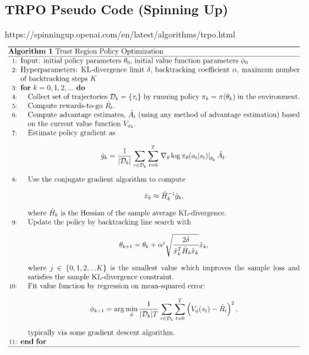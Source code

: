 \documentclass{article}
\theoremstyle{definition}
\theoremstyle{note}
\begin{document}
\subsection*{TRPO Pseudo Code (Spinning Up)}
https://spinningup.openai.com/en/latest/algorithms/trpo.html\\
\includegraphics[scale=0.5]{./trpo.png}


\newpage
\end{document}
